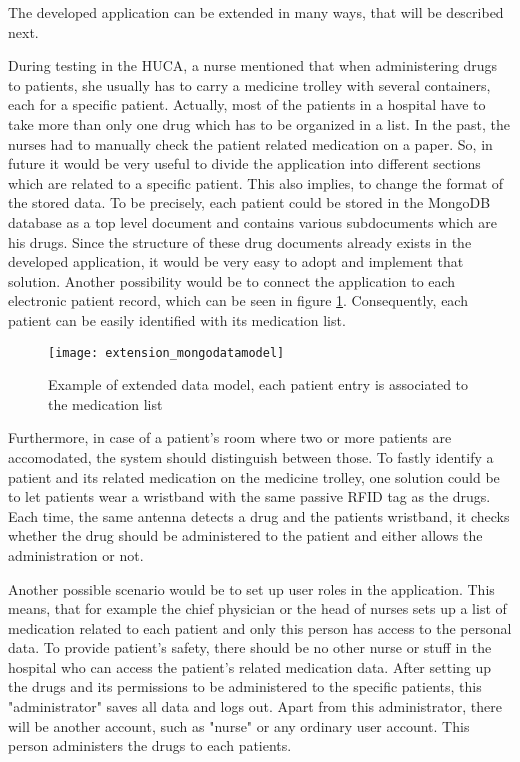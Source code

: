 The developed application can be extended in many ways, that will be described next.

During testing in the HUCA, a nurse mentioned that when administering drugs to patients, she usually has to carry a medicine trolley with several containers, each for a specific patient. Actually, most of the patients in a hospital have to take more than only one drug which has to be organized in a list. In the past, the nurses had to manually check the patient related medication on a paper.
So, in future it would be very useful to divide the application into different sections which are related to a specific patient. This also implies, to change the format of the stored data. To be precisely, each patient could be stored in the MongoDB database as a top level document and contains various subdocuments which are his drugs. Since the structure of these drug documents already exists in the developed application, it would be very easy to adopt and implement that solution. Another possibility would be to connect the application to each electronic patient record, which can be seen in figure \ref{fig:newdatamodel}. Consequently, each patient can be easily identified with its medication list.

\begin{figure}
\centering
\texttt{[image: extension\_mongodatamodel]} 
\caption{\label{fig:newdatamodel}Example of extended data model, each patient entry is associated to the medication list} 
\end{figure}

Furthermore, in case of a patient's room where two or more patients are accomodated, the system should distinguish between those. To fastly identify a patient and its related medication on the medicine trolley, one solution could be to let patients wear a wristband with the same passive RFID tag as the drugs. Each time, the same antenna detects a drug and the patients wristband, it checks whether the drug should be administered to the patient and either allows the administration or not.

Another possible scenario would be to set up user roles in the application. This means, that for example the chief physician or the head of nurses sets up a list of medication related to each patient and only this person has access to the personal data. To provide patient's safety, there should be no other nurse or stuff in the hospital who can access the patient's related medication data. After setting up the drugs and its permissions to be administered to the specific patients, this "administrator" saves all data and logs out. 
Apart from this administrator, there will be another account, such as "nurse" or any ordinary user account. This person administers the drugs to each patients.